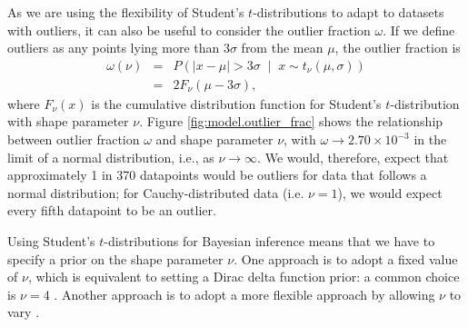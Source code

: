 \documentclass[fleqn,usenatbib]{rasti}
\newcommand{\studentt}[2]{t_\nu \left( #1, #2 \right)}
\begin{document}

As we are using the flexibility of Student's $t$-distributions to adapt to
datasets with outliers, it can also be useful to consider the outlier fraction
$\omega$. If we define outliers as any points lying more than $3\sigma$ from the
mean $\mu$, the outlier fraction is
\begin{eqnarray}
    \omega(\nu)
    &=& P\left(
        \left|x - \mu \right| > 3 \sigma \;
        \middle| \;
        x \sim \studentt{\mu}{\sigma}
    \right) \\
    &=& 2 F_\nu \left(\mu - 3 \sigma \right),
\end{eqnarray}
where $F_\nu(x)$ is the cumulative distribution function for Student's
$t$-distribution with shape parameter $\nu$. Figure \ref{fig:model.outlier_frac}
shows the relationship between outlier fraction $\omega$ and shape parameter
$\nu$, with $\omega \rightarrow 2.70 \times 10^{-3} $ in the limit of a normal
distribution, i.e., as $\nu \rightarrow \infty$. We would, therefore, expect
that approximately 1 in 370 datapoints would be outliers for data that follows a
normal distribution; for Cauchy-distributed data (i.e. $\nu = 1$),
we would expect every fifth datapoint to be an outlier.


Using Student's $t$-distributions for Bayesian inference means that we have to
specify a prior on the shape parameter $\nu$. One approach is to adopt a fixed
value of $\nu$, which is equivalent to setting a Dirac delta function prior: a
common choice is $\nu = 4$ \citep[e.g.][]{Berger:1994, Gelman:2013}.  Another
approach is to adopt a more flexible approach by allowing $\nu$ to vary
\citep[e.g.][]{Juarez:2010, Park:2017, Feeney:2018}.
\end{document}
